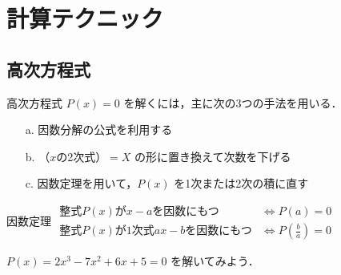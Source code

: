\chapter{計算テクニック}
\newcommand\Binom[2]{\bigg(\begin{array}{@{\,}c@{\,}}#1\\[-.5mm]#2\end{array}\bigg)}

\section{高次方程式}


高次方程式 $P(x)=0$ を解くには，主に次の3つの手法を用いる．

\begin{enumerate}
\item[a.] 因数分解の公式を利用する
\item[b.] \<（$x$の2次式）\<$=X$ の形に置き換えて次数を下げる
\item[c.] 因数定理を用いて，$P(x)$ を1次または2次の積に直す
\end{enumerate}
\begin{titlebox}{因数定理}
$\begin{array}{ll}
\text{整式$P(x)$が$x-a$を因数にもつ}&\Longleftrightarrow P(a)=0\\
\text{整式$P(x)$が1次式$ax-b$を因数にもつ}&\Longleftrightarrow P\left (\frac{b}{a}\right )=0
\end{array}$\\
\end{titlebox}
\begin{例}
$P(x)=2x^{3}-7x^{2}+6x+5=0$ を解いてみよう．
\end{例}
